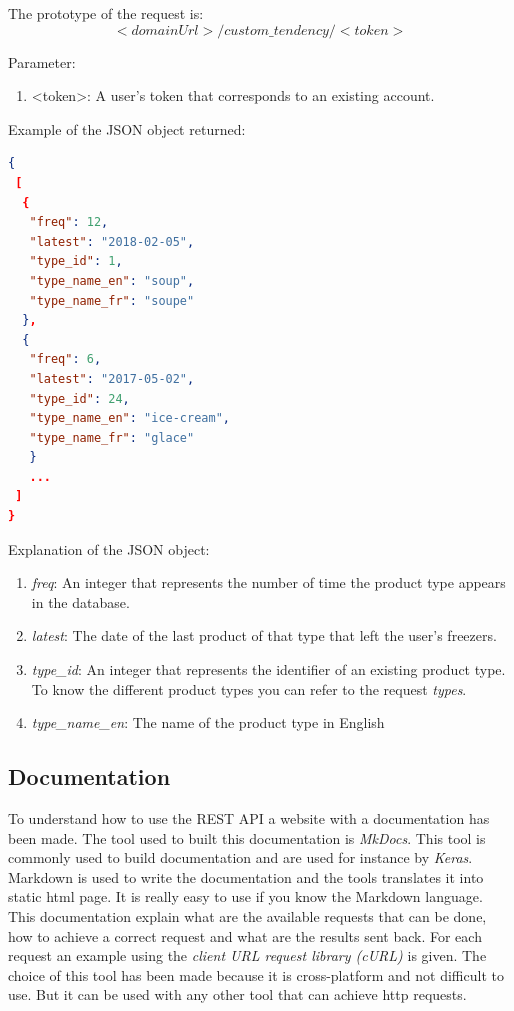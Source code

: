 The prototype of the request is:
$$<domainUrl>/custom\_tendency/<token>$$

Parameter:
\begin{enumerate}
\item <token>: A user's token that corresponds to an existing account.
\end{enumerate}

Example of the JSON object returned:
\begin{lstlisting}[language=json]
{
 [
  {
   "freq": 12, 
   "latest": "2018-02-05", 
   "type_id": 1, 
   "type_name_en": "soup", 
   "type_name_fr": "soupe"
  }, 
  {
   "freq": 6, 
   "latest": "2017-05-02", 
   "type_id": 24, 
   "type_name_en": "ice-cream", 
   "type_name_fr": "glace"
   }
   ...
 ]
}
\end{lstlisting}

Explanation of the  JSON object:
\begin{enumerate}
\item \textit{freq}: An integer that represents the number of time the product type appears in the database.
\item \textit{latest}: The date of the last product of that type that left the user's freezers.
\item \textit{type\_id}: An integer that represents the identifier of an existing product type. To know the different product types you can refer to the request \textit{types}.
\item \textit{type\_name\_en}: The name of the product type in English
\end{enumerate}

\subsection{Documentation}
To understand how to use the REST API a website with a documentation has been made. The tool used to built this documentation is \textit{MkDocs}. This tool is commonly used to build documentation and are used for instance by \textit{Keras}. Markdown is used to write the documentation and the tools translates it into static html page. It is really easy to use if you know the Markdown language. \\

This documentation explain what are the available requests that can be done, how to achieve a correct request and what are the results sent back.
For each request an example using the \textit{client URL request library (cURL)} is given. The choice of this tool has been made because  it is cross-platform and not difficult to use. But it can be used with any other tool that can achieve http requests.

